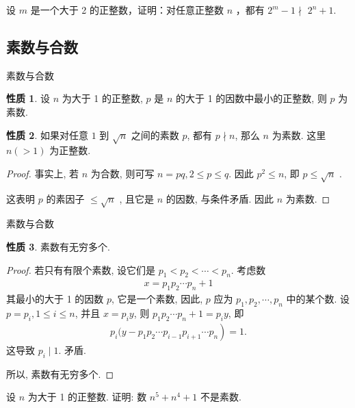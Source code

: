 \documentclass[aspectratio=169]{ctexbeamer}
\theoremstyle{definition}
\newtheorem{property}{性质}[section]
\begin{document}
\begin{frame}[t]
	\begin{example}
		设 $m$ 是一个大于 2 的正整数，证明：对任意正整数 $n$ ，都有 $2^{m}-1 \nmid$ $2^{n}+1$.
	\end{example}
\end{frame}

\subsection{素数与合数}
\begin{frame}{素数与合数}
	\begin{property}
		设 $n$ 为大于 1 的正整数, $p$ 是 $n$ 的大于 1 的因数中最小的正整数, 则 $p$ 为素数.
	\end{property}
	\begin{property}
		如果对任意 $1$ 到 $\sqrt{n}$ 之间的素数 $p$, 都有 $p \nmid n$, 那么 $n$ 为素数. 这里 $n(>1)$ 为正整数.
	\end{property}
	\begin{proof}
		事实上, 若 $n$ 为合数, 则可写 $n=p q, 2 \leqslant p \leqslant q$. 因此 $p^{2} \leqslant n$, 即 $p \leqslant \sqrt{n}$ .

		这表明 $p$ 的素因子 $\leqslant \sqrt{n}$ , 且它是 $n$ 的因数, 与条件矛盾. 因此 $n$ 为素数.
	\end{proof}
\end{frame}

\begin{frame}{素数与合数}
	\begin{property}
		素数有无穷多个.
	\end{property}
	\begin{proof}
		若只有有限个素数, 设它们是 $p_{1}<p_{2}<\cdots<p_{n}$. 考虑数
		\begin{align*}
			x=p_{1} p_{2} \cdots p_{n}+1
		\end{align*}
		其最小的大于 1 的因数 $p$, 它是一个素数, 因此, $p$ 应为 $p_{1}, p_{2}, \cdots, p_{n}$ 中的某个数. 设 $p=p_{i}, 1 \leqslant i \leqslant n$, 并且 $x=p_{i} y$, 则 $p_{1} p_{2} \cdots p_{n}+1=p_{i} y$, 即
		\begin{align*}
			p_{i}(y-\left.p_{1} p_{2} \cdots p_{i-1} p_{i+1} \cdots p_{n}\right)=1.
		\end{align*}
		这导致 $p_{i} \mid 1$. 矛盾.

		所以, 素数有无穷多个.
	\end{proof}
\end{frame}

\begin{frame}[t]
	\begin{example}
		设 $n$ 为大于 1 的正整数. 证明: 数 $n^{5}+n^{4}+1$ 不是素数.
	\end{example}
\end{frame}
\end{document}
